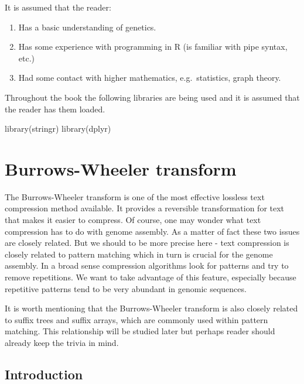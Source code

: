 \documentclass[
]{book}
\newenvironment{Shaded}{\begin{snugshade}}{\end{snugshade}}
\newcommand{\FunctionTok}[1]{\textcolor[rgb]{0.00,0.00,0.00}{#1}}
\newcommand{\NormalTok}[1]{#1}
\begin{document}
It is assumed that the reader:

\begin{enumerate}
\def\labelenumi{\arabic{enumi}.}
\item
  Has a basic understanding of genetics.
\item
  Has some experience with programming in R (is familiar with pipe syntax, etc.)
\item
  Had some contact with higher mathematics, e.g.~statistics, graph theory.
\end{enumerate}

Throughout the book the following libraries are being used and it is assumed that the reader has them loaded.

\begin{Shaded}
\begin{Highlighting}[]
\FunctionTok{library}\NormalTok{(stringr)}
\FunctionTok{library}\NormalTok{(dplyr)}
\end{Highlighting}
\end{Shaded}

\hypertarget{bwt}{%
\chapter{Burrows-Wheeler transform}\label{bwt}}

The Burrows-Wheeler transform is one of the most effective lossless text compression method available. It provides a reversible transformation for text that makes it easier to compress. Of course, one may wonder what text compression has to do with genome assembly. As a matter of fact these two issues are closely related. But we should to be more precise here - text compression is closely related to pattern matching which in turn is crucial for the genome assembly. In a broad sense compression algorithms look for patterns and try to remove repetitions. We want to take advantage of this feature, especially because repetitive patterns tend to be very abundant in genomic sequences.

It is worth mentioning that the Burrows-Wheeler transform is also closely related to suffix trees and suffix arrays, which are commonly used within pattern matching. This relationship will be studied later but perhaps reader should already keep the trivia in mind. \citep{bw1}

\hypertarget{introduction-1}{%
\section{Introduction}\label{introduction-1}}
\end{document}
